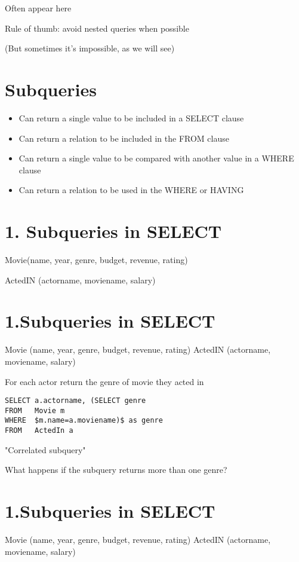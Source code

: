 \documentclass{article}
\begin{document}
Often appear here

Rule of thumb: avoid nested queries when possible

(But sometimes it's impossible, as we will see)

\section*{Subqueries}

\begin{itemize}
\item Can return a single value to be included in a SELECT clause
\item Can return a relation to be included in the FROM clause
\item Can return a single value to be compared with another value in a WHERE clause
\item Can return a relation to be used in the WHERE or HAVING
\end{itemize}

\section*{1. Subqueries in SELECT}

Movie(name, year, genre, budget, revenue, rating)

ActedIN (actorname, moviename, salary)

\section*{1.Subqueries in SELECT}

Movie (name, year, genre, budget, revenue, rating) ActedIN (actorname, moviename, salary)

For each actor return the genre of movie they acted in

\begin{verbatim}
SELECT a.actorname, (SELECT genre
FROM   Movie m
WHERE  $m.name=a.moviename)$ as genre
FROM   ActedIn a
\end{verbatim}

"Correlated subquery"

What happens if the subquery returns more than one genre?

\section*{1.Subqueries in SELECT}

Movie (name, year, genre, budget, revenue, rating) ActedIN (actorname, moviename, salary)
\end{document}
